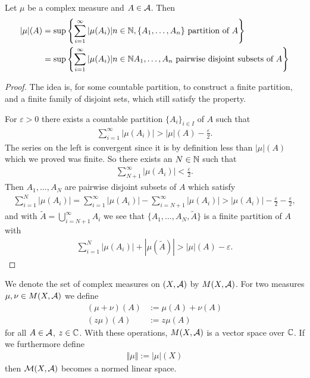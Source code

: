 \documentclass[../../main.tex]{subfiles}
\begin{document}
\begin{corollary}\label{cor: stupid corollary}
Let $\mu$ be a complex measure and $A\in \mathcal{A}$. Then
\begin{align*}
	|\mu|(A)&=\sup\left\{ \sum_{i=1}^{\infty} |\mu(A_{i}) | n\in \mathbb{N}, \{A_{1}, \dots, A_{n}\} \text{ partition of } A \right\} \\
	&=\sup\left\{ \sum_{i=1}^{\infty} |\mu(A_{i}) | n\in \mathbb{N} A_{1}, \dots, A_{n} \text{ pairwise disjoint subsets of } A \right\}
\end{align*}
\end{corollary}
\begin{proof}
The idea is, for some countable partition, to construct a finite partition, and a finite family of disjoint sets, which still satisfy the property.

For $\varepsilon>0$ there exists a countable partition $\{A_{i}\}_{i\in I}$ of $A$ such that
\begin{align*}
	\sum_{i=1}^{\infty} |\mu(A_{i})| > |\mu|(A)-\frac{\varepsilon}{2}.
\end{align*}
The series on the left is convergent since it is by definition less than $|\mu|(A)$ which we proved was finite. So there exists an $N\in \mathbb{N}$ such that
\begin{align*}
	\sum_{N+1}^{\infty} |\mu(A_{i})| < \frac{\varepsilon}{2}.
\end{align*}
Then $A_{1}, \dots, A_{N}$ are pairwise disjoint subsets of $A$ which satisfy
\begin{align*}
	\sum_{i=1}^{N}|\mu(A_{i})| = \sum_{i=1}^{\infty}|\mu(A_{i})| - \sum_{i=N+1}^{\infty}|\mu(A_{i})| > |\mu(A_{i})|-\frac{\varepsilon}{2}-\frac{\varepsilon}{2},
\end{align*}
and with $\tilde{A}=\bigcup_{i=N+1}^{\infty}A_{i}$ we see that $\{A_{1}, \dots, A_{N}, \tilde{A}\}$ is a finite partition of $A$ with
\begin{align*}
	\sum_{i=1}^{N}|\mu(A_{i})| + |\mu(\tilde{A})| > |\mu|(A)-\varepsilon.
\end{align*}
\end{proof}


We denote the set of complex measures on $(X, \mathcal{A})$ by $M(X, \mathcal{A})$.
For two measures $\mu, \nu \in M(X, \mathcal{A})$ we define
\begin{align*}
	(\mu + \nu)(A)&:=\mu(A)+\nu(A) \\
	(z\mu)(A)&:=z\mu(A)
\end{align*}
for all $A\in \mathcal{A}$, $z\in \mathbb{C}$. With these operations, $M(X, \mathcal{A})$ is a vector space over $\mathbb{C}$. If we furthermore define
\begin{align*}
	\Vert \mu \Vert := |\mu|(X)
\end{align*}
then $\mathcal{M}(X, \mathcal{A})$ becomes a normed linear space.
\end{document}
